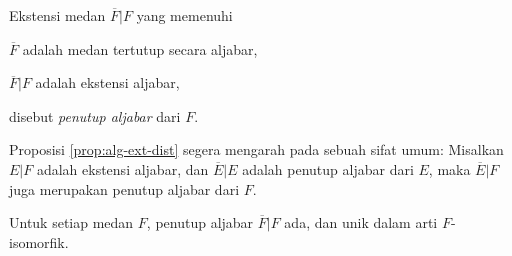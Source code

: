 \begin{definition}
	Ekstensi medan $\overline{F}|F$ yang memenuhi
	\begin{inparaenum}[(i)]
		\item $\overline{F}$ adalah medan tertutup secara aljabar,
		\item $\overline{F}|F$ adalah ekstensi aljabar,
	\end{inparaenum}
	disebut \emph{penutup aljabar} dari $F$.
\end{definition}
Proposisi \ref{prop:alg-ext-dist} segera mengarah pada sebuah sifat umum: Misalkan $E|F$ adalah ekstensi aljabar, dan $\overline{E}|E$ adalah penutup aljabar dari $E$, maka $\overline{E}|F$ juga merupakan penutup aljabar dari $F$.

\begin{theorem}[E.\ Steinitz]\label{prop:alg-closure}
	Untuk setiap medan $F$, penutup aljabar $\overline{F}|F$ ada, dan unik dalam arti $F$-isomorfik.
\end{theorem}
